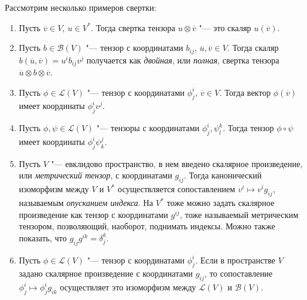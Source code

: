 \begin{example}
	Рассмотрим несколько примеров свертки:
	\begin{enumerate}
		\item Пусть $\overline{v} \in V$, $u \in V^*$. Тогда свертка тензора $u \otimes \overline{v}$ "--- это скаляр $u(\overline{v})$.
		\item Пусть $b \in \mathcal{B}(V)$ "--- тензор с координатами $b_{ij}$, $\overline{u}, \overline{v} \in V$. Тогда скаляр $b(\overline{u}, \overline{v}) = u^ib_{ij}v^j$ получается как \textit{двойная}, или \textit{полная}, свертка тензора $\overline{u} \otimes b \otimes \overline{v}$.
		\item Пусть $\phi \in \mathcal{L}(V)$ "--- тензор с координатами $\phi^i_j$, $\overline{v} \in V$. Тогда вектор $\phi(\overline{v})$ имеет координаты $\phi^i_jv^j$.
		\item Пусть $\phi, \psi \in \mathcal{L}(V)$ "--- тензоры с координатами $\phi^i_j, \psi^k_l$. Тогда тензор $\phi \circ \psi$ имеет координаты $\phi^i_j\psi^j_k$.
		\item Пусть $V$ "--- евклидово пространство, в нем введено скалярное произведение, или \textit{метрический тензор}, с координатами $g_{ij}$. Тогда канонический изоморфизм между $V$ и $V^*$ осуществляется сопоставлением $v^i \mapsto v^ig_{ij}$, называемым \textit{опусканием индекса}. На $V^*$ тоже можно задать скалярное произведение как тензор с координатами $g^{ij}$, тоже называемый метрическим тензором, позволяющий, наоборот, поднимать индексы. Можно также показать, что $g_{ij}g^{ik} = \delta^k_j$.
		\item Пусть $\phi \in \mathcal{L}(V)$ "--- тензор с координатами $\phi^i_j$. Если в пространстве $V$ задано скалярное произведение с координатами $g_{ij}$, то сопоставление $\phi^i_j \mapsto \phi^i_jg_{ik}$ осуществляет это изоморфизм между $\mathcal{L}(V)$ и $\mathcal{B}(V)$.
	\end{enumerate}
\end{example}